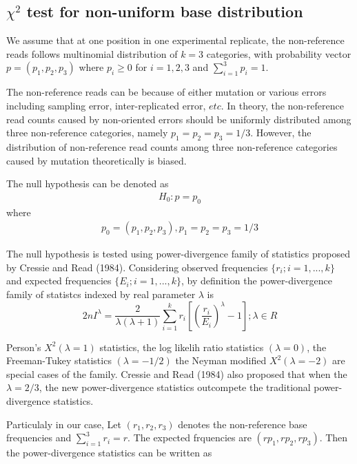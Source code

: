\documentclass[11pt,reqno]{amsart}
\begin{document}
\subsection{$\chi^2$ test for non-uniform base distribution}

We assume that at one position in one experimental replicate, the non-reference reads follows multinomial distribution of $k = 3$ categories, with probability vector $p = (p_1, p_2, p_3)$ where $p_i \geq 0$ for $i =1, 2, 3$ and $\sum_{i=1}^3 p_i = 1$.

The non-reference reads can be because of either mutation or various errors including sampling error, inter-replicated error, $etc$. In theory, the non-reference read counts caused by non-oriented errors should be uniformly distributed among three non-reference categories, namely $p_1=p_2=p_3=1/3$. However, the distribution of non-reference read counts among three non-reference categories caused by mutation theoretically is biased. 

The null hypothesis can be denoted as
\begin{align}
 H_0: p=p_0
\end{align}
where
\begin{align} 
 p_0=(p_1,p_2,p_3), p_1=p_2=p_3=1/3
\end{align}

The null hypothesis is tested using power-divergence family of statistics proposed by Cressie and Read (1984). Considering observed frequencies $\{r_i; i=1,...,k\}$ and expected frequencies $\{E_i; i=1,...,k\}$, by definition the power-divergence family of statistcs indexed by real parameter $\lambda$ is 
\begin{equation}
 2nI^\lambda = \frac{2}{\lambda(\lambda+1)}\sum_{i=1}^k r_i \left[\left(\frac{r_i}{E_i}\right)^\lambda-1\right];\lambda \in R
\end{equation}

Person's $X^2 (\lambda = 1)$ statistics, the log likelih ratio statistics $(\lambda = 0)$, the Freeman-Tukey statistics $(\lambda = -1/2)$ the Neyman modified $X^2 (\lambda = -2)$ are special cases of the family. Cressie and Read (1984) also proposed that when the $\lambda =2/3$, the new power-divergence statistics outcompete the traditional power-divergence statistics. 

Particulaly in our case, Let $(r_1,r_2,r_3)$ denotes the non-reference base frequencies and $\sum_{i=1}^3 r_i = r$. The expected frquencies are $(rp_1, rp_2, rp_3)$. Then the power-divergence statistics can be written as
\end{document}
